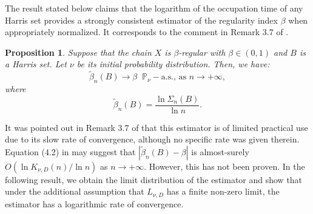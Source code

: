 \documentclass[sn-mathphys-ay]{sn-jnl}%
\newtheorem{proposition}{Proposition}[section]%
\begin{document}

The result stated below claims that the logarithm of the occupation time of any Harris
set provides a strongly consistent estimator of the regularity index $\beta$ when
appropriately normalized. It corresponds to the comment in Remark 3.7 of
\cite{Tjostheim-2001}.

\begin{proposition}
    Suppose that the chain $X$ is $\beta$-regular with $\beta\in (0,1)$ and $B$ is a Harris set. Let $\nu$ be its initial probability distribution. Then, we have:
    \begin{equation}\label{eq:as_convergence_occupation_time_estimator}
        \widetilde{\beta}_n(B)\to \beta\;\; \mathbb{P}_{\nu}- \text{a.s., as } n\to +\infty,
    \end{equation}
    where
    \begin{equation}\label{eq:est3}
        \widetilde{\beta}_n(B)=\frac{\ln \Sigma_n(B)}{\ln n}.
    \end{equation}

\end{proposition}

It was pointed out in Remark 3.7 of \cite{Tjostheim-2001} that this estimator is of
limited practical use due to its slow rate of convergence, although no specific rate was
given therein. Equation (4.2) in \cite{Chen1999} may suggest that
$|\widetilde{\beta}_n(B)-\beta|$ is almost-surely $O(\ln{K_{\nu ,D}(n)}/\ln n)$ as $n\to
    +\infty$. However, this has not been proven. In the following result, we obtain the limit
distribution of the estimator and show that under the additional assumption that
$L_{\nu,D}$ has a finite non-zero limit, the estimator has a logarithmic rate of
convergence.
\end{document}
